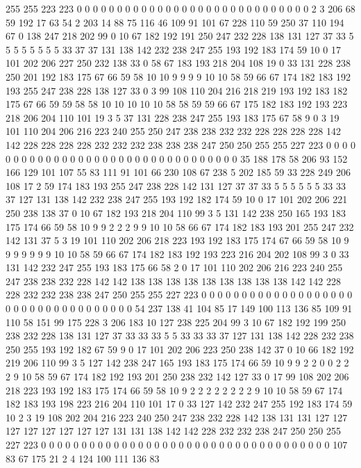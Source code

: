 255 255 223 223 0 0 0 0 0 0 0 0 0 0 0 0 0 0 0 0
0 0 0 0 0 0 0 0 0 0 0 0 0 2 3 206 68 59 192 17
63 54 2 203 14 88 75 116 46 109 91 101 67 228 110 59 250 37 110 194
67 0 138 247 218 202 99 0 10 67 182 192 191 250 247 232 228 138 131 127
37 33 5 5 5 5 5 5 5 5 33 37 37 131 138 142 232 238 247 255
193 192 183 174 59 10 0 17 101 202 206 227 250 232 138 33 0 58 67 183
193 218 204 108 19 0 33 131 228 238 250 201 192 183 175 67 66 59 58 10
10 9 9 9 9 10 10 58 59 66 67 174 182 183 192 193 255 247 238 228
138 127 33 0 3 99 108 110 204 216 218 219 193 192 183 182 175 67 66 59
59 58 58 10 10 10 10 10 58 58 59 59 66 67 175 182 183 192 193 223
218 206 204 110 101 19 3 5 37 131 228 238 247 255 193 183 175 67 58 9
0 3 19 101 110 204 206 216 223 240 255 250 247 238 238 232 232 228 228 228
228 142 142 228 228 228 228 232 232 232 238 238 238 247 250 250 255 255 227 223
0 0 0 0 0 0 0 0 0 0 0 0 0 0 0 0 0 0 0 0
0 0 0 0 0 0 0 0 0 0 0 0 0 35 188 178 58 206 93 152
166 129 101 107 55 83 111 91 101 66 230 108 67 238 5 202 185 59 33 228
249 206 108 17 2 59 174 183 193 255 247 238 228 142 131 127 37 37 33 5
5 5 5 5 5 33 33 37 127 131 138 142 232 238 247 255 193 192 182 174
59 10 0 17 101 202 206 221 250 238 138 37 0 10 67 182 193 218 204 110
99 3 5 131 142 238 250 165 193 183 175 174 66 59 58 10 9 9 2 2
2 9 9 10 10 58 66 67 174 182 183 193 201 255 247 232 142 131 37 5
3 19 101 110 202 206 218 223 193 192 183 175 174 67 66 59 58 10 9 9
9 9 9 9 9 10 10 58 59 66 67 174 182 183 192 193 223 216 204 202
108 99 3 0 33 131 142 232 247 255 193 183 175 66 58 2 0 17 101 110
202 206 216 223 240 255 247 238 238 232 228 142 142 138 138 138 138 138 138 138
138 138 142 142 228 228 232 232 238 238 247 250 255 255 227 223 0 0 0 0
0 0 0 0 0 0 0 0 0 0 0 0 0 0 0 0 0 0 0 0
0 0 0 0 0 0 0 0 0 0 0 54 237 138 41 104 85 17 149 100
113 136 85 109 91 110 58 151 99 175 228 3 206 183 10 127 238 225 204 99
3 10 67 182 192 199 250 238 232 228 138 131 127 37 33 33 33 5 5 33
33 33 37 127 131 138 142 228 232 238 250 255 193 192 182 67 59 9 0 17
101 202 206 223 250 238 142 37 0 10 66 182 192 219 206 110 99 3 5 127
142 238 247 165 193 183 175 174 66 59 10 9 9 2 2 0 0 2 2 2
9 10 58 59 67 174 182 192 193 201 250 238 232 142 127 33 0 17 99 108
202 206 218 223 193 192 183 175 174 66 59 58 10 9 2 2 2 2 2 2
2 2 9 10 10 58 59 67 174 182 183 193 198 223 216 204 110 101 17 0
33 127 142 232 247 255 192 183 174 59 10 2 3 19 108 202 204 216 223 240
250 247 238 232 228 142 138 131 131 127 127 127 127 127 127 127 127 131 131 138
142 142 228 232 232 238 247 250 250 255 227 223 0 0 0 0 0 0 0 0
0 0 0 0 0 0 0 0 0 0 0 0 0 0 0 0 0 0 0 0
0 0 0 0 0 0 0 0 107 83 67 175 21 2 4 124 100 111 136 83
